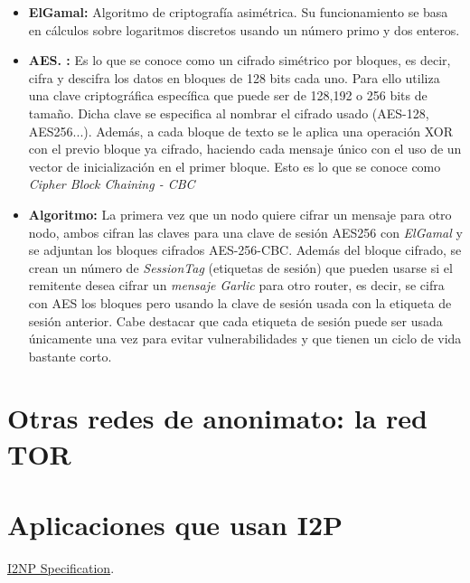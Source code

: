 \begin{itemize}

\item \textbf{ElGamal:}
Algoritmo de criptografía asimétrica. Su funcionamiento se basa en cálculos sobre logaritmos discretos usando un número primo y dos enteros.   


\item \textbf{AES. :}
Es lo que se conoce como un cifrado simétrico por bloques, es decir, cifra y descifra los datos en bloques de 128 bits cada uno. Para ello utiliza una clave criptográfica específica que puede ser de 128,192 o 256 bits de tamaño. Dicha clave se especifica al nombrar el cifrado usado (AES-128, AES256...). Además, a cada bloque de texto se le aplica una operación XOR con el previo bloque ya cifrado, haciendo cada mensaje único con el uso de un vector de inicialización en el primer bloque. Esto es lo que se conoce como \textit{Cipher Block Chaining - CBC} 


\item \textbf{Algoritmo:} La primera vez que un nodo quiere cifrar un mensaje para otro nodo, ambos cifran las claves para una clave de sesión AES256 con \textit{ElGamal} y se adjuntan los bloques cifrados  AES-256-CBC.
Además del bloque cifrado, se crean un número de \textit{SessionTag} (etiquetas de sesión) que pueden usarse si el remitente desea cifrar un \textit{mensaje Garlic} para otro router, es decir, se cifra con AES los bloques pero usando la clave de sesión usada con la etiqueta de sesión anterior. 
Cabe destacar que cada etiqueta de sesión puede ser usada únicamente una vez para evitar vulnerabilidades y que tienen un ciclo de vida bastante corto.


\end{itemize}




    \section{Otras redes de anonimato: la red TOR}
    
    
    
    
    \section{Aplicaciones que usan I2P}
    
    
   
\begin{thebibliography}{9}


   \href{https://geti2p.net/spec/i2np}{I2NP Specification}.
   
  
  
  

\end{thebibliography}

